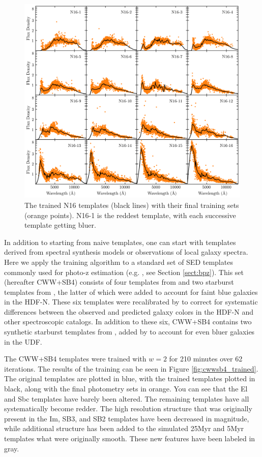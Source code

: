 \begin{figure}
    \centering
    \includegraphics{figures/N16_trained.png}
    \caption{The trained N16 templates (black lines) with their final training sets (orange points). N16-1 is the reddest template, with each successive template getting bluer. }
    \label{fig:N16_trained}
\end{figure}

In addition to starting from naive templates, one can start with templates derived from spectral synthesis models or observations of local galaxy spectra. 
Here we apply the training algorithm to a standard set of SED templates commonly used for photo-z estimation (e.g. \bpz, see Section \ref{sect:bpz}).
This set (hereafter CWW+SB4) consists of four templates from \citet{Coleman1980a} and two starburst templates from \citet{Kinney1996a}, the latter of which were added to account for faint blue galaxies in the HDF-N. 
These six templates were recalibrated by \citet{Benitez2004a} to correct for systematic differences between the observed and predicted galaxy colors in the HDF-N and other spectroscopic catalogs. 
In addition to these six, CWW+SB4 contains two synthetic starburst templates from \citet{Bruzual2003b}, added by \citet{Coe2006a} to account for even bluer galaxies in the UDF.

The CWW+SB4 templates were trained with $w=2$ for 210 minutes over 62 iterations.
The results of the training can be seen in Figure \ref{fig:cwwsb4_trained}.
The original templates are plotted in blue, with the trained templates plotted in black, along with the final photometry sets in orange.
You can see that the El and Sbc templates have barely been altered. The remaining templates have all systematically become redder.
The high resolution structure that was originally present in the Im, SB3, and SB2 templates have been decreased in magnitude, while additional structure has been added to the simulated 25Myr and 5Myr templates what were originally smooth.
These new features have been labeled in gray.


